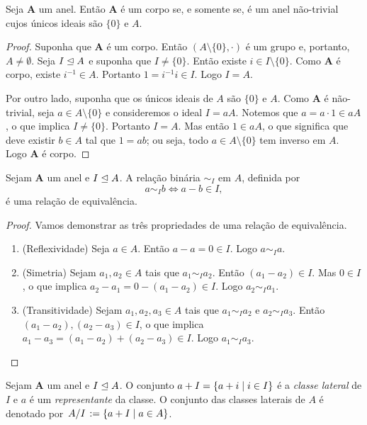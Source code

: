 \begin{proposition}
\label{pro:corp.sse.ide}
	Seja $\bm A$ um anel. Então $\bm A$ é um corpo se, e somente se, é um anel não-trivial cujos únicos ideais são $\{0\}$ e $A$.
\end{proposition}
\begin{proof}
	Suponha que $\bm A$ é um corpo. Então $(A\setminus\{0\},\cdot)$ é um grupo e, portanto, $A \neq \emptyset$. Seja $I \mathrel{\unlhd} A$ e suponha que $I \neq \{0\}$. Então existe $i \in I\setminus\{0\}$. Como $\bm A$ é corpo, existe $i^{-1} \in A$. Portanto $1=i^{-1}i \in I$. Logo $I=A$.

	Por outro lado, suponha que os únicos ideais de $A$ são $\{0\}$ e $A$. Como $\bm A$ é não-trivial, seja $a \in A\setminus\{0\}$ e consideremos o ideal $I=aA$. Notemos que $a=a \cdot 1 \in aA$, o que implica $I \neq \{0\}$. Portanto $I=A$. Mas então $1 \in aA$, o que significa que deve existir $b \in A$ tal que $1=ab$; ou seja, todo $a \in A\setminus\{0\}$ tem inverso em $A$. Logo $\bm A$ é corpo.
\end{proof}

\begin{proposition}
	Sejam $\bm A$ um anel e $I \mathrel{\unlhd} A$. A relação binária $\sim_I$ em $A$, definida por
	\begin{equation*}
	a \sim_I b \Leftrightarrow a-b \in I,
	\end{equation*}
é uma relação de equivalência.
\end{proposition}
\begin{proof} Vamos demonstrar as três propriedades de uma relação de equivalência.
	\begin{enumerate}
	\item (Reflexividade) Seja $a \in A$. Então $a-a=0 \in I$. Logo $a \sim_I a$.
	\item (Simetria) Sejam $a_1,a_2 \in A$ tais que $a_1 \sim_I a_2$. Então $(a_1-a_2) \in I$. Mas $0 \in I$, o que implica $a_2-a_1 = 0-(a_1-a_2) \in I$. Logo $a_2 \sim_I a_1$.
	\item (Transitividade) Sejam $a_1,a_2,a_3 \in A$ tais que $a_1 \sim_I a_2$ e $a_2 \sim_I a_3$. Então $(a_1-a_2),(a_2-a_3) \in I$, o que implica $a_1-a_3=(a_1-a_2)+(a_2-a_3) \in I$. Logo $a_1 \sim_I a_3$.
	\end{enumerate}
\end{proof}

\begin{definition}
Sejam $\bm A$ um anel e $I \mathrel{\unlhd} A$. O conjunto $a+I = \left\{{a+i}\;\middle\vert\;{i \in I}\right\}$ é a \emph{classe lateral} de $I$ e $a$ é um \emph{representante} da classe. O conjunto das classes laterais de $A$ é denotado por $\quo{A}{I} := \set{a+I}{a \in A}$.
\end{definition}

